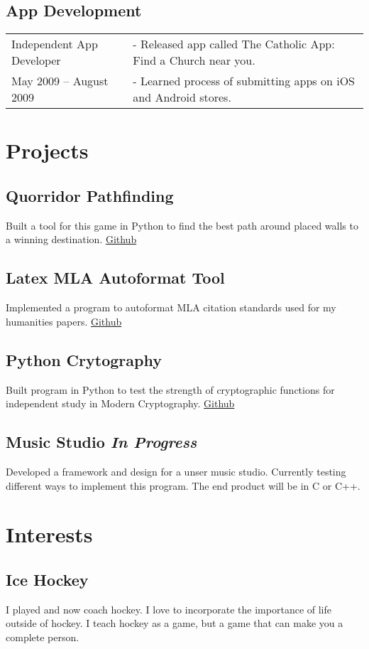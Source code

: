 \documentclass{article}[11pt]
\begin{document}
	\subsection*{App Development}
	\begin{tabular}{@{}p{5cm}l}
	Independent App Developer	& - Released app called The Catholic App: Find a Church near you. \\
	May 2009 -- August 2009 	& - Learned process of submitting apps on iOS and Android stores.
	\end{tabular}
\begin{multicols}{2}
	\section*{Projects}
		\subsection*{Quorridor Pathfinding}
		Built a tool for this game in Python to find the best path around placed walls to a winning destination. \href{https://github.com/bizzk3t/Graph}{Github}
		\subsection*{Latex MLA Autoformat Tool}
		Implemented a program to autoformat MLA citation standards used for my humanities papers. \href{https://github.com/bizzk3t/LatexMLA}{Github}
		\subsection*{Python Crytography}
		Built program in Python to test the strength of cryptographic functions for independent study in Modern Cryptography. \href{https://github.com/bizzk3t/PythonCrypto}{Github}
		\subsection*{Music Studio \textit{In Progress}}
		Developed a framework and design for a unser music studio. Currently testing different ways to implement this program. The end product will be in C or C++.
		\vfill
		\columnbreak
	\section*{Interests}
	\subsection*{Ice Hockey}
	I played and now coach hockey. I love to incorporate the importance of life outside of hockey. I teach hockey as a game, but a game that can make you a complete person. 

\end{multicols}
\end{document}
